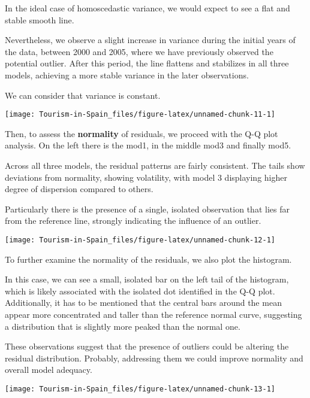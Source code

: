 \documentclass[
]{article}
\begin{document}
In the ideal case of homoscedastic variance, we would expect to see a
flat and stable smooth line.

Nevertheless, we observe a slight increase in variance during the
initial years of the data, between 2000 and 2005, where we have
previously observed the potential outlier. After this period, the line
flattens and stabilizes in all three models, achieving a more stable
variance in the later observations.

We can consider that variance is constant.

\begin{center}\texttt{[image: Tourism-in-Spain\_files/figure-latex/unnamed-chunk-11-1]} \end{center}

Then, to assess the \textbf{normality} of residuals, we proceed with the
Q-Q plot analysis. On the left there is the mod1, in the middle mod3 and
finally mod5.

Across all three models, the residual patterns are fairly consistent.
The tails show deviations from normality, showing volatility, with model
3 displaying higher degree of dispersion compared to others.

Particularly there is the presence of a single, isolated observation
that lies far from the reference line, strongly indicating the influence
of an outlier.

\begin{center}\texttt{[image: Tourism-in-Spain\_files/figure-latex/unnamed-chunk-12-1]} \end{center}

To further examine the normality of the residuals, we also plot the
histogram.

In this case, we can see a small, isolated bar on the left tail of the
histogram, which is likely associated with the isolated dot identified
in the Q-Q plot. Additionally, it has to be mentioned that the central
bars around the mean appear more concentrated and taller than the
reference normal curve, suggesting a distribution that is slightly more
peaked than the normal one.

These observations suggest that the presence of outliers could be
altering the residual distribution. Probably, addressing them we could
improve normality and overall model adequacy.

\begin{center}\texttt{[image: Tourism-in-Spain\_files/figure-latex/unnamed-chunk-13-1]} \end{center}
\end{document}
